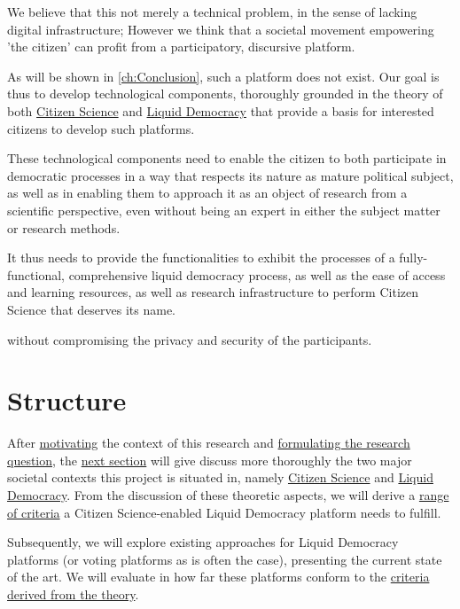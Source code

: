 We believe that this not merely a technical problem, in the sense of lacking digital infrastructure; However we think that a societal movement empowering 'the citizen' can profit from a participatory, discursive platform.

As will be shown in \ref{ch:Conclusion}, such a platform does not exist. Our goal is thus to develop technological components, thoroughly grounded in the theory of both \hyperref[sec:Theory_CS]{Citizen Science} and \hyperref[sec:Liquid_Democracy]{Liquid Democracy} that provide a basis for interested citizens to develop such platforms.

These technological components need to enable the citizen to both participate in democratic processes in a way that respects its nature as mature political subject, as well as in enabling them to approach it as an object of research from a scientific perspective, even without being an expert in either the subject matter or research methods. 

It thus needs to provide the functionalities to exhibit the processes of a fully-functional, comprehensive liquid democracy process, as well as the ease of access and learning resources, as well as research infrastructure to perform Citizen Science that deserves its name.



without compromising the privacy and security of the participants.

\section{Structure}
\label{sec:structure}


After \hyperref[sec:Motivation]{motivating} the context of this research and \hyperref[sec:Objective]{formulating the research question}, the \hyperref[ch:Theory]{next section} will give discuss more thoroughly the two major societal contexts this project is situated in, namely \hyperref[sec:Theory_CS]{Citizen Science} and \hyperref[sec:Liquid_Democracy]{Liquid Democracy}. From the discussion of these theoretic aspects, we will derive a \hyperref[sec:Criteria]{range of criteria} a Citizen Science-enabled Liquid Democracy platform needs to fulfill.

Subsequently, we will explore existing approaches for Liquid Democracy platforms (or voting platforms as is often the case), presenting the current state of the art. We will evaluate in how far these platforms conform to the \hyperref[sec:Criteria]{criteria derived from the theory}. 

